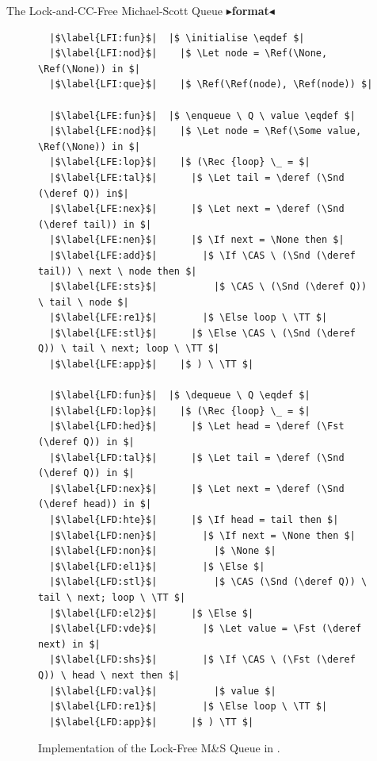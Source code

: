 \documentclass[9pt]{beamer}
\newcommand{\initialise}{\operatorname{initialize}}
\newcommand{\enqueue}{\operatorname{enqueue}}
\newcommand{\dequeue}{\operatorname{dequeue}}
\newcommand{\msq}{M\&S Queue}
\newcommand{\lfmsq}{Lock-Free \msq{}}
\newcommand{\todo}[1]{{\color[rgb]{.5,0,0}\textbf{$\blacktriangleright$#1$\blacktriangleleft$}}}
\begin{document}
\begin{frame}[containsverbatim]{The Lock-and-CC-Free Michael-Scott Queue}
  \todo{format}
  \begin{figure}
  \begin{verbatim}
  |$\label{LFI:fun}$|  |$ \initialise \eqdef $|
  |$\label{LFI:nod}$|    |$ \Let node = \Ref(\None, \Ref(\None)) in $|
  |$\label{LFI:que}$|    |$ \Ref(\Ref(node), \Ref(node)) $|

  |$\label{LFE:fun}$|  |$ \enqueue \ Q \ value \eqdef $|
  |$\label{LFE:nod}$|    |$ \Let node = \Ref(\Some value, \Ref(\None)) in $|
  |$\label{LFE:lop}$|    |$ (\Rec {loop} \_ = $|
  |$\label{LFE:tal}$|      |$ \Let tail = \deref (\Snd (\deref Q)) in$|
  |$\label{LFE:nex}$|      |$ \Let next = \deref (\Snd (\deref tail)) in $|
  |$\label{LFE:nen}$|      |$ \If next = \None then $|
  |$\label{LFE:add}$|        |$ \If \CAS \ (\Snd (\deref tail)) \ next \ node then $|
  |$\label{LFE:sts}$|          |$ \CAS \ (\Snd (\deref Q)) \ tail \ node $|
  |$\label{LFE:re1}$|        |$ \Else loop \ \TT $|
  |$\label{LFE:stl}$|      |$ \Else \CAS \ (\Snd (\deref Q)) \ tail \ next; loop \ \TT $|
  |$\label{LFE:app}$|    |$ ) \ \TT $|

  |$\label{LFD:fun}$|  |$ \dequeue \ Q \eqdef $|
  |$\label{LFD:lop}$|    |$ (\Rec {loop} \_ = $|
  |$\label{LFD:hed}$|      |$ \Let head = \deref (\Fst (\deref Q)) in $|
  |$\label{LFD:tal}$|      |$ \Let tail = \deref (\Snd (\deref Q)) in $|
  |$\label{LFD:nex}$|      |$ \Let next = \deref (\Snd (\deref head)) in $|
  |$\label{LFD:hte}$|      |$ \If head = tail then $|
  |$\label{LFD:nen}$|        |$ \If next = \None then $|
  |$\label{LFD:non}$|          |$ \None $|
  |$\label{LFD:el1}$|        |$ \Else $|
  |$\label{LFD:stl}$|          |$ \CAS (\Snd (\deref Q)) \ tail \ next; loop \ \TT $|
  |$\label{LFD:el2}$|      |$ \Else $|
  |$\label{LFD:vde}$|        |$ \Let value = \Fst (\deref next) in $|
  |$\label{LFD:shs}$|        |$ \If \CAS \ (\Fst (\deref Q)) \ head \ next then $|
  |$\label{LFD:val}$|          |$ value $|
  |$\label{LFD:re1}$|        |$ \Else loop \ \TT $|
  |$\label{LFD:app}$|      |$ ) \TT $|
  \end{verbatim}
  \caption{Implementation of the \lfmsq{} in \heaplang.}
  \label{LFMSQ:implementation:code}
  \end{figure}
\end{frame}
\end{document}
